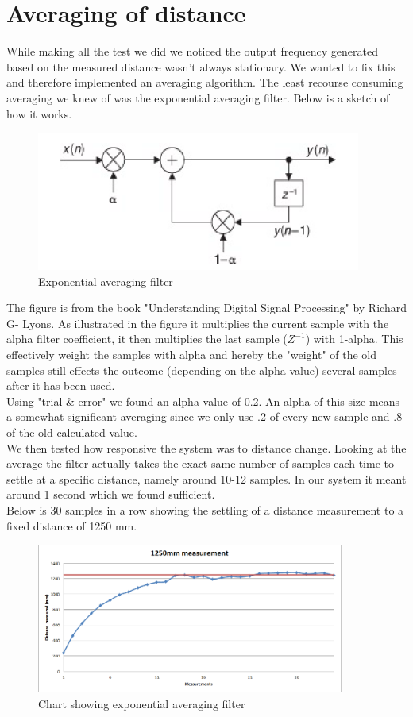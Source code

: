 \section{Averaging of distance}
While making all the test we did we noticed the output frequency generated based on the measured distance wasn't always stationary. We wanted to fix this and therefore implemented an averaging algorithm. The least recourse consuming averaging we knew of was the exponential averaging filter. Below is a sketch of how it works.\\
\begin{figure}[H]
\centering
\includegraphics[width=.5\textwidth]{billeder/exp_avg}
\caption{Exponential averaging filter}
\end{figure}
The figure is from the book "Understanding Digital Signal Processing" by Richard G- Lyons. As illustrated in the figure it multiplies the current sample with the alpha filter coefficient, it then multiplies the last sample ($Z^{-1}$) with 1-alpha. This effectively  weight the samples with alpha and hereby the "weight" of the old samples still effects the outcome (depending on the alpha value) several samples after it has been used.\\
Using "trial \& error" we found an alpha value of 0.2. An alpha of this size means a somewhat significant averaging since we only use .2 of every new sample and .8 of the old calculated value.\\
We then tested how responsive the system was to distance change. Looking at the average the filter actually takes the exact same number of samples each time to settle at a specific distance, namely around 10-12 samples. In our system it meant around 1 second which we found sufficient.\\
Below is 30 samples in a row showing the settling of a distance measurement to a fixed distance of 1250 mm.\\
\begin{figure}[H]
\centering
\includegraphics[width=0.9\textwidth]{billeder/avg_chart}
\caption{Chart showing exponential averaging filter}
\end{figure}
